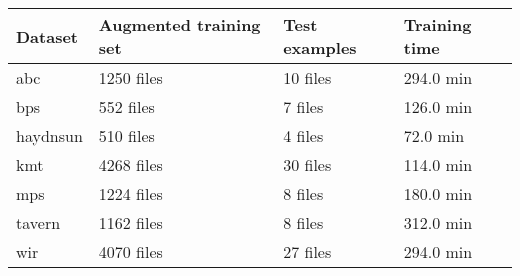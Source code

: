 \begin{tabular}{l|lll}
Dataset        & Augmented training set & Test examples & Training time \\ \hline
\gls{abc}      & 1250  files                 & 10 files           & 294.0 min         \\
\gls{bps}      & 552   files                 & 7  files           & 126.0 min         \\
\gls{haydnsun} & 510   files                 & 4  files           & 72.0 min         \\
\gls{kmt}      & 4268  files                 & 30 files           & 114.0 min         \\
\gls{mps}      & 1224  files                 & 8  files           & 180.0 min         \\
\gls{tavern}   & 1162  files                 & 8  files           & 312.0 min         \\
\gls{wir}      & 4070  files                 & 27 files           & 294.0 min        
\end{tabular}







